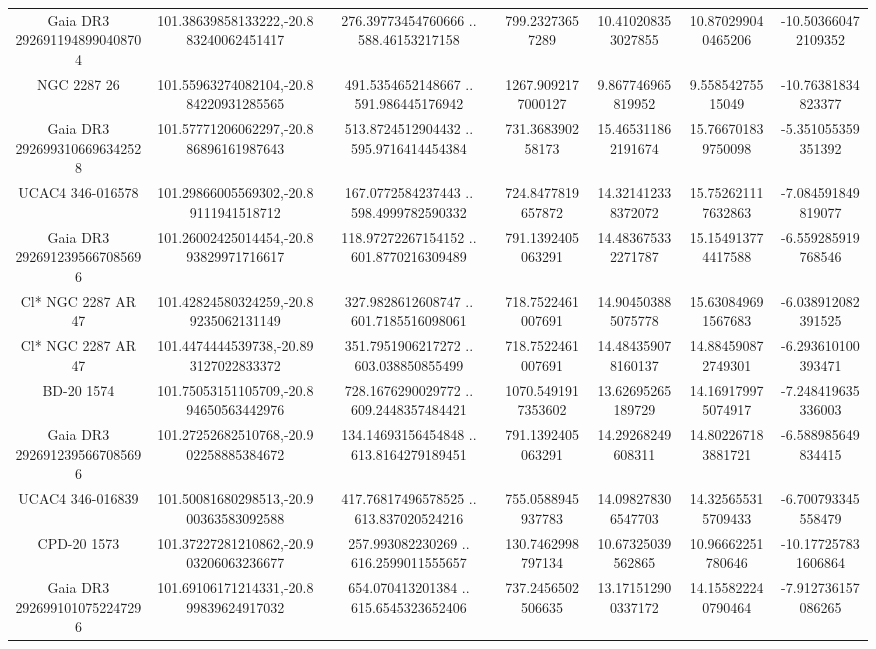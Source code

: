 \begin{table}
\begin{tabular}{ccccccc}
Gaia DR3 2926911948990408704 & 101.38639858133222,-20.883240062451417 & 276.39773454760666 .. 588.46153217158 & 799.23273657289 & 10.410208353027855 & 10.870299040465206 & -10.503660472109352 \\
NGC  2287    26 & 101.55963274082104,-20.884220931285565 & 491.5354652148667 .. 591.986445176942 & 1267.9092177000127 & 9.867746965819952 & 9.55854275515049 & -10.76381834823377 \\
Gaia DR3 2926993106696342528 & 101.57771206062297,-20.886896161987643 & 513.8724512904432 .. 595.9716414454384 & 731.368390258173 & 15.465311862191674 & 15.766701839750098 & -5.351055359351392 \\
UCAC4 346-016578 & 101.29866005569302,-20.89111941518712 & 167.0772584237443 .. 598.4999782590332 & 724.8477819657872 & 14.321412338372072 & 15.752621117632863 & -7.084591849819077 \\
Gaia DR3 2926912395667085696 & 101.26002425014454,-20.893829971716617 & 118.97272267154152 .. 601.8770216309489 & 791.1392405063291 & 14.483675332271787 & 15.154913774417588 & -6.559285919768546 \\
Cl* NGC 2287     AR      47 & 101.42824580324259,-20.89235062131149 & 327.9828612608747 .. 601.7185516098061 & 718.7522461007691 & 14.904503885075778 & 15.630849691567683 & -6.038912082391525 \\
Cl* NGC 2287     AR      47 & 101.4474444539738,-20.893127022833372 & 351.7951906217272 .. 603.038850855499 & 718.7522461007691 & 14.484359078160137 & 14.884590872749301 & -6.293610100393471 \\
BD-20  1574 & 101.75053151105709,-20.894650563442976 & 728.1676290029772 .. 609.2448357484421 & 1070.5491917353602 & 13.62695265189729 & 14.169179975074917 & -7.248419635336003 \\
Gaia DR3 2926912395667085696 & 101.27252682510768,-20.902258885384672 & 134.14693156454848 .. 613.8164279189451 & 791.1392405063291 & 14.29268249608311 & 14.802267183881721 & -6.588985649834415 \\
UCAC4 346-016839 & 101.50081680298513,-20.900363583092588 & 417.76817496578525 .. 613.837020524216 & 755.0588945937783 & 14.098278306547703 & 14.325655315709433 & -6.700793345558479 \\
CPD-20  1573 & 101.37227281210862,-20.903206063236677 & 257.993082230269 .. 616.2599011555657 & 130.7462998797134 & 10.67325039562865 & 10.96662251780646 & -10.177257831606864 \\
Gaia DR3 2926991010752247296 & 101.69106171214331,-20.899839624917032 & 654.070413201384 .. 615.6545323652406 & 737.2456502506635 & 13.171512900337172 & 14.155822240790464 & -7.912736157086265 \\

\end{tabular}
\end{table}
